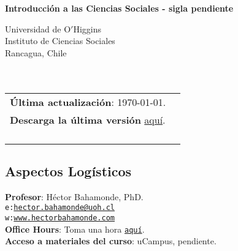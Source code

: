 \documentclass[letterpaper]{article}
\def\name{Introducci\'on a las Ciencias Sociales - {\color{red}sigla pendiente}}
\begin{document}

\centerline{\huge \bf \name}

\vspace{0.25in}

\begin{minipage}{0.45\linewidth}
 Universidad de O$'$Higgins \\
  Instituto de Ciencias Sociales \\
  Rancagua, Chile\\
  \\
  \\

\end{minipage}
\hspace{4cm}\begin{minipage}{0.45\linewidth}
  \begin{tabular}{ll}
{\bf \'Ultima actualizaci\'on}: \today. \\
 {\bf Descarga la \'ultima versi\'on} \href{https://github.com/hbahamonde/Intro_Ciencias_Sociales/raw/master/Bahamonde_Intro_Ciencias_Sociales.pdf}{aqu\'i}.%
    \\
    \\
    \\
    \\
    \\
  \end{tabular}
\end{minipage}

\subsection*{Aspectos Log\'isticos}


\vspace{1mm}
{\bf Profesor}: H\'ector Bahamonde, PhD.\\
\texttt{e:}\href{mailto:hector.bahamonde@uoh.cl}{\texttt{hector.bahamonde@uoh.cl}}\\
\texttt{w:}\href{http://www.hectorbahamonde.com}{\texttt{www.hectorbahamonde.com}}\\
{\bf Office Hours}: Toma una hora \href{https://calendly.com/bahamonde/officehours}{\texttt{aqu\'i}}.\\
{\bf Acceso a materiales del curso}: {\color{red}uCampus, pendiente}.
\end{document}
